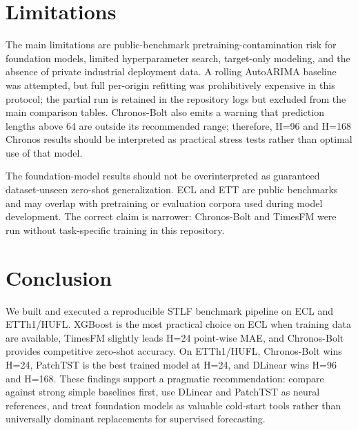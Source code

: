 \documentclass[11pt,a4paper]{article}
\begin{document}
\section{Limitations}
The main limitations are public-benchmark pretraining-contamination risk for foundation models, limited hyperparameter search, target-only modeling, and the absence of private industrial deployment data. A rolling AutoARIMA baseline was attempted, but full per-origin refitting was prohibitively expensive in this protocol; the partial run is retained in the repository logs but excluded from the main comparison tables. Chronos-Bolt also emits a warning that prediction lengths above 64 are outside its recommended range; therefore, H=96 and H=168 Chronos results should be interpreted as practical stress tests rather than optimal use of that model.

The foundation-model results should not be overinterpreted as guaranteed dataset-unseen zero-shot generalization. ECL and ETT are public benchmarks and may overlap with pretraining or evaluation corpora used during model development. The correct claim is narrower: Chronos-Bolt and TimesFM were run without task-specific training in this repository.

\section{Conclusion}
We built and executed a reproducible STLF benchmark pipeline on ECL and ETTh1/HUFL. XGBoost is the most practical choice on ECL when training data are available, TimesFM slightly leads H=24 point-wise MAE, and Chronos-Bolt provides competitive zero-shot accuracy. On ETTh1/HUFL, Chronos-Bolt wins H=24, PatchTST is the best trained model at H=24, and DLinear wins H=96 and H=168. These findings support a pragmatic recommendation: compare against strong simple baselines first, use DLinear and PatchTST as neural references, and treat foundation models as valuable cold-start tools rather than universally dominant replacements for supervised forecasting.
\end{document}
